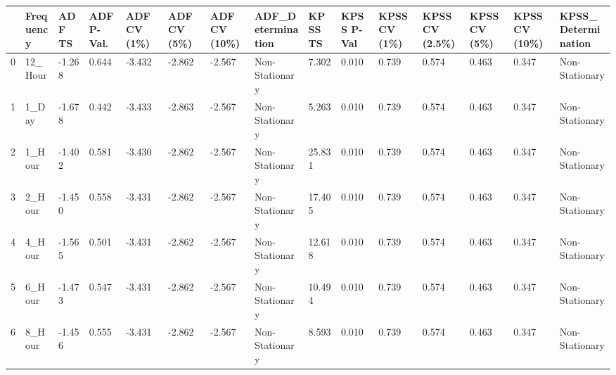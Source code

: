 \begin{tabular}{lllllllllllllll}
\toprule
 & Frequency & ADF TS & ADF P-Val. & ADF CV (1\%) & ADF CV (5\%) & ADF CV (10\%) & ADF_Determination & KPSS TS & KPSS P-Val & KPSS CV (1\%) & KPSS CV (2.5\%) & KPSS CV (5\%) & KPSS CV (10\%) & KPSS_Determination \\
\midrule
0 & 12_Hour & -1.268 & 0.644 & -3.432 & -2.862 & -2.567 & Non-Stationary & 7.302 & 0.010 & 0.739 & 0.574 & 0.463 & 0.347 & Non-Stationary \\
1 & 1_Day & -1.678 & 0.442 & -3.433 & -2.863 & -2.567 & Non-Stationary & 5.263 & 0.010 & 0.739 & 0.574 & 0.463 & 0.347 & Non-Stationary \\
2 & 1_Hour & -1.402 & 0.581 & -3.430 & -2.862 & -2.567 & Non-Stationary & 25.831 & 0.010 & 0.739 & 0.574 & 0.463 & 0.347 & Non-Stationary \\
3 & 2_Hour & -1.450 & 0.558 & -3.431 & -2.862 & -2.567 & Non-Stationary & 17.405 & 0.010 & 0.739 & 0.574 & 0.463 & 0.347 & Non-Stationary \\
4 & 4_Hour & -1.565 & 0.501 & -3.431 & -2.862 & -2.567 & Non-Stationary & 12.618 & 0.010 & 0.739 & 0.574 & 0.463 & 0.347 & Non-Stationary \\
5 & 6_Hour & -1.473 & 0.547 & -3.431 & -2.862 & -2.567 & Non-Stationary & 10.494 & 0.010 & 0.739 & 0.574 & 0.463 & 0.347 & Non-Stationary \\
6 & 8_Hour & -1.456 & 0.555 & -3.431 & -2.862 & -2.567 & Non-Stationary & 8.593 & 0.010 & 0.739 & 0.574 & 0.463 & 0.347 & Non-Stationary \\
\bottomrule
\end{tabular}
